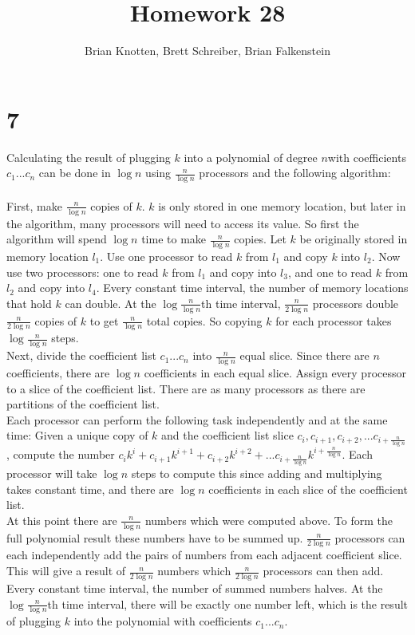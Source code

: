 \documentclass[letterpaper,notitlepage,twoside]{article}
\begin{document}
\title{Homework 28}
\author{Brian Knotten, Brett Schreiber, Brian Falkenstein}
\maketitle
\section*{7}
Calculating the result of plugging $k$ into a polynomial of degree $n$with coefficients $c_1...c_n$ can be done in $\log n$ using $\frac{n}{\log n}$ processors and the following algorithm:
\\\\
First, make $\frac{n}{\log n}$ copies of $k$. $k$ is only stored in one memory location, but later in the algorithm, many processors will need to access its value. So first the algorithm will spend $\log n$ time to make $\frac{n}{\log n}$ copies. Let $k$ be originally stored in memory location $l_1$. Use one processor to read $k$ from $l_1$ and copy $k$ into $l_2$. Now use two processors: one to read $k$ from $l_1$ and copy into $l_3$, and one to read $k$ from $l_2$ and copy into $l_4$. Every constant time interval, the number of memory locations that hold $k$ can double. At the $\log \frac{n}{\log n}$th time interval, $\frac{n}{2 \log n}$ processors double $\frac{n}{2 \log n}$ copies of $k$ to get $\frac{n}{\log n}$ total copies. So copying $k$ for each processor takes $\log \frac{n}{\log n}$ steps.
\\
Next, divide the coefficient list $c_1...c_n$ into $\frac{n}{\log n}$ equal slice. Since there are $n$ coefficients, there are $\log{n}$ coefficients in each equal slice. Assign every processor to a slice of the coefficient list. There are as many processors as there are partitions of the coefficient list.
\\
Each processor can perform the following task independently and at the same time: Given a unique copy of $k$ and the coefficient list slice $c_i, c_{i + 1}, c_{i + 2}, ... c_{i + \frac{n}{\log n}}$, compute the number $c_ik^i + c_{i + 1}k^{i + 1} + c_{i + 2}k^{i + 2} + ... c_{i + \frac{n}{\log n}}k^{i + \frac{n}{\log n}}$. Each processor will take $\log n$ steps to compute this since adding and multiplying takes constant time, and there are $\log n$ coefficients in each slice of the coefficient list.
\\
At this point there are $\frac{n}{\log n}$ numbers which were computed above. To form the full polynomial result these numbers have to be summed up. $\frac{n}{2 \log n}$ processors can each independently add the pairs of numbers from each adjacent coefficient slice. This will give a result of $\frac{n}{2 \log n}$ numbers which $\frac{n}{2 \log n}$ processors can then add. Every constant time interval, the number of summed numbers halves. At the $\log \frac{n}{\log n}$th time interval, there will be exactly one number left, which is the result of plugging $k$ into the polynomial with coefficients $c_1...c_n$.
\end{document}
